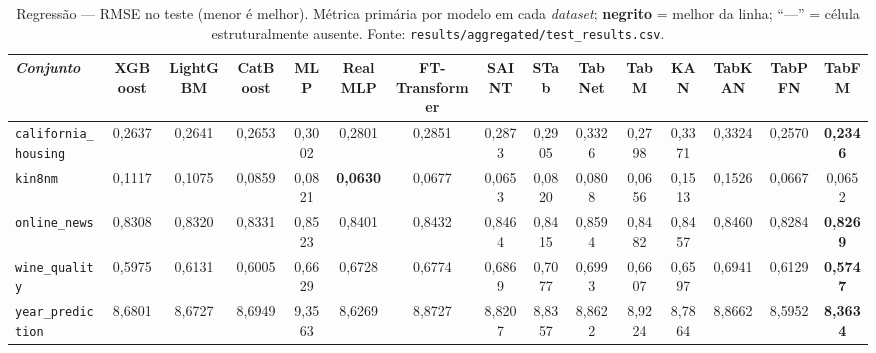 \begin{landscape}
\begin{table}[htbp]
\centering
\scriptsize
\setlength{\tabcolsep}{3pt}
\caption[Regressão --- resultados completos]{Regressão --- RMSE no teste (menor é melhor). Métrica primária por modelo em cada \emph{dataset}; \textbf{negrito} = melhor da linha; ``---'' = célula estruturalmente ausente. Fonte: \texttt{results/\allowbreak aggregated/\allowbreak test\_\allowbreak results.\allowbreak csv}.}
\label{tab:app-regressao}
\begin{tabular}{lcccccccccccccc}
\toprule
\emph{Conjunto} & XGBoost & LightGBM & CatBoost & MLP & RealMLP & FT-Transformer & SAINT & STab & TabNet & TabM & KAN & TabKAN & TabPFN & TabFM \\
\midrule
\texttt{california\_\allowbreak housing} & 0{,}2637 & 0{,}2641 & 0{,}2653 & 0{,}3002 & 0{,}2801 & 0{,}2851 & 0{,}2873 & 0{,}2905 & 0{,}3326 & 0{,}2798 & 0{,}3371 & 0{,}3324 & 0{,}2570 & \textbf{0{,}2346} \\
\texttt{kin8nm} & 0{,}1117 & 0{,}1075 & 0{,}0859 & 0{,}0821 & \textbf{0{,}0630} & 0{,}0677 & 0{,}0653 & 0{,}0820 & 0{,}0808 & 0{,}0656 & 0{,}1513 & 0{,}1526 & 0{,}0667 & 0{,}0652 \\
\texttt{online\_news} & 0{,}8308 & 0{,}8320 & 0{,}8331 & 0{,}8523 & 0{,}8401 & 0{,}8432 & 0{,}8464 & 0{,}8415 & 0{,}8594 & 0{,}8482 & 0{,}8457 & 0{,}8460 & 0{,}8284 & \textbf{0{,}8269} \\
\texttt{wine\_quality} & 0{,}5975 & 0{,}6131 & 0{,}6005 & 0{,}6629 & 0{,}6728 & 0{,}6774 & 0{,}6869 & 0{,}7077 & 0{,}6993 & 0{,}6607 & 0{,}6597 & 0{,}6941 & 0{,}6129 & \textbf{0{,}5747} \\
\texttt{year\_\allowbreak prediction} & 8{,}6801 & 8{,}6727 & 8{,}6949 & 9{,}3563 & 8{,}6269 & 8{,}8727 & 8{,}8207 & 8{,}8357 & 8{,}8622 & 8{,}9224 & 8{,}7864 & 8{,}8662 & 8{,}5952 & \textbf{8{,}3634} \\
\bottomrule
\end{tabular}
\end{table}

\end{landscape}

